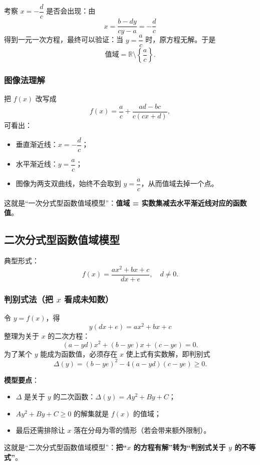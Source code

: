 \documentclass[a4paper,11pt]{ctexart}
\begin{document}
考察 $x=-\dfrac{d}{c}$ 是否会出现：由
\[
  x = \frac{b-dy}{cy-a} = -\frac{d}{c}
\]
得到一元一次方程，最终可以验证：当 $y=\dfrac{a}{c}$ 时，原方程无解。于是
\[
  \text{值域} = \mathbb{R}\setminus\left\{\frac{a}{c}\right\}.
\]

\subsubsection{图像法理解}

把 $f(x)$ 改写成
\[
  f(x) = \frac{a}{c} + \frac{ad-bc}{c(cx+d)},
\]
可看出：

\begin{itemize}
  \item 垂直渐近线：$x=-\dfrac{d}{c}$；
  \item 水平渐近线：$y=\dfrac{a}{c}$；
  \item 图像为两支双曲线，始终不会取到 $y=\dfrac{a}{c}$，从而值域去掉一个点。
\end{itemize}

这就是“一次分式型函数值域模型”：\textbf{值域 = 实数集减去水平渐近线对应的函数值}。

\subsection{二次分式型函数值域模型}

典型形式：
\[
  f(x) = \frac{ax^2+bx+c}{dx+e},\quad d\ne0.
\]

\subsubsection{判别式法（把 $x$ 看成未知数）}

令 $y=f(x)$，得
\[
  y(dx+e) = ax^2+bx+c
\]
整理为关于 $x$ 的二次方程：
\[
  (a-yd)x^2 + (b-ye)x + (c-ye) = 0.
\]
为了某个 $y$ 能成为函数值，必须存在 $x$ 使上式有实数解，即判别式
\[
  \Delta(y) = (b-ye)^2 - 4(a-yd)(c-ye) \ge 0.
\]

\textbf{模型要点}：

\begin{itemize}
  \item $\Delta$ 是关于 $y$ 的二次函数：$\Delta(y)=Ay^2+By+C$；
  \item $Ay^2+By+C\ge0$ 的解集就是 $f(x)$ 的值域；
  \item 最后还需排除让 $x$ 落在分母为零的情形（若会带来额外限制）。
\end{itemize}

这就是“二次分式型函数值域模型”：\textbf{把“$x$ 的方程有解”转为“判别式关于 $y$ 的不等式”}。
\end{document}
